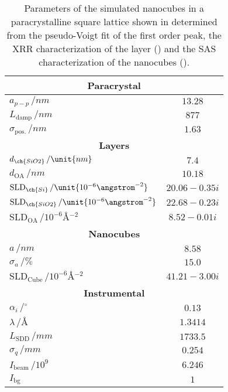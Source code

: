 \documentclass[\main/dresen_thesis.tex]{subfiles}
\begin{document}
  \begin{table}[!htbp]
    \centering
    \caption{\label{tab:monolayers:structure:squareArrayParacrystal:BornAgainSimulation}Parameters of the simulated nanocubes in a paracrystalline square lattice shown in  determined from the pseudo-Voigt fit of the first order peak, the XRR characterization of the layer () and the SAS characterization of the nanocubes ().}
    \begin{tabular}{l | c}
      \hline
      \multicolumn{2}{c}{\textbf{Paracrystal}}\\
      \hline
      $a_{p-p} \, / \unit{nm}$                                        & $13.28$ \\
      $L_\mathrm{damp} \, / \unit{nm}$                                & $877$ \\
      $\sigma_\mathrm{pos.}\, / \unit{nm}$                            & $1.63$ \\
      \hline
      \multicolumn{2}{c}{\textbf{Layers}}\\
      \hline
      $d_{\ch{SiO2}}\, / \unit{nm}$                                   & $7.4$\\
      $d_{\mathrm{OA}}\, / \unit{nm}$                                 & $10.18$\\
      $\mathrm{SLD}_{\ch{Si}} \, / \unit{10^{-6} \angstrom^{-2}}$     & $20.06 - 0.35 i$\\
      $\mathrm{SLD}_{\ch{SiO2}} \, / \unit{10^{-6} \angstrom^{-2}}$   & $22.68 - 0.23 i$\\
      $\mathrm{SLD}_\mathrm{OA} \, / \unit{10^{-6} \angstrom^{-2}}$   & $8.52 - 0.01 i$ \\
      \hline
      \multicolumn{2}{c}{\textbf{Nanocubes}}\\
      \hline
      $a \, / \unit{nm}$                                              & $8.58$ \\
      $\sigma_a \, / \unit{\%}$                                       & $15.0$ \\
      $\mathrm{SLD}_\mathrm{Cube} \, / \unit{10^{-6} \angstrom^{-2}}$ & $41.21 - 3.00 i$ \\
      \hline
      \multicolumn{2}{c}{\textbf{Instrumental}}\\
      \hline
      $\alpha_i \, / \unit{^\circ}$                                   & $0.13$ \\
      $\lambda \, / \unit{\angstrom}$                                 & $1.3414$ \\
      $L_\mathrm{SDD} \, / \unit{mm}$                                 & $1733.5$ \\
      $\sigma_q \, /\unit{mm}$                                        & $0.254$ \\
      $I_\mathrm{beam} \, / \unit{10^9}$                              & $6.246$ \\
      $I_\mathrm{bg}$                                                 & $1$ \\
      \hline
    \end{tabular}
  \end{table}
\end{document}
